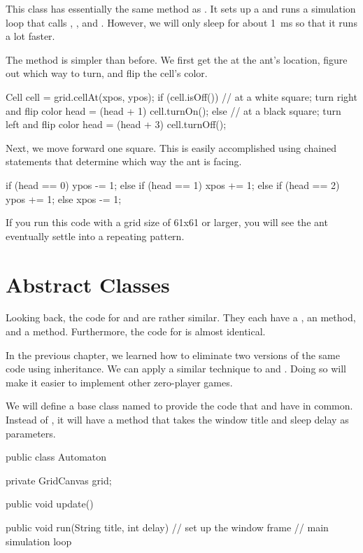 This class has essentially the same  method as .
It sets up a  and runs a simulation loop that calls , , and .
However, we will only sleep for about 1~ms so that it runs a lot faster.

The  method is simpler than before.
We first get the  at the ant's location, figure out which way to turn, and flip the cell's color.

\begin{code}
Cell cell = grid.cellAt(xpos, ypos);
if (cell.isOff()) {
    // at a white square; turn right and flip color
    head = (head + 1) %
    cell.turnOn();
} else {
    // at a black square; turn left and flip color
    head = (head + 3) %
    cell.turnOff();
}
\end{code}

Next, we move forward one square.
This is easily accomplished using chained  statements that determine which way the ant is facing.

\begin{code}
if (head == 0) {
    ypos -= 1;
} else if (head == 1) {
    xpos += 1;
} else if (head == 2) {
    ypos += 1;
} else {
    xpos -= 1;
}
\end{code}

If you run this code with a grid size of 61x61 or larger, you will see the ant eventually settle into a repeating pattern.


\section{Abstract Classes}

Looking back, the code for  and  are rather similar.
They each have a , an  method, and a  method.
Furthermore, the code for  is almost identical.

In the previous chapter, we learned how to eliminate two versions of the same code using inheritance.
We can apply a similar technique to  and .
Doing so will make it easier to implement other zero-player games.

We will define a base class named  to provide the code that  and  have in common.
Instead of , it will have a  method that takes the window title and sleep delay as parameters.

\begin{code}
public class Automaton {
    private GridCanvas grid;

    public void update() {
    }

    public void run(String title, int delay) {
        // set up the window frame
        // main simulation loop
    }
}
\end{code}

